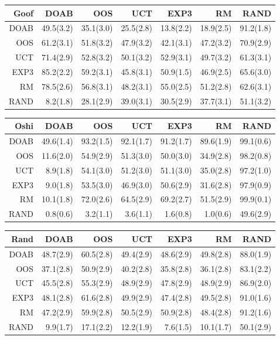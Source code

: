 \begin{figure}
\begin{footnotesize}
\begin{tabular}{|r|rrrrrr|}\hline
Goof&DOAB&OOS&UCT&EXP3&RM&RAND\\\hline
DOAB&49.5(3.2)&35.1(3.0)&25.5(2.8)&13.8(2.2)&18.9(2.5)&91.2(1.8)\\
OOS&61.2(3.1)&51.8(3.2)&47.9(3.2)&42.1(3.1)&47.2(3.2)&70.9(2.9)\\
UCT&71.4(2.9)&52.8(3.2)&50.1(3.2)&52.9(3.1)&49.7(3.2)&61.3(3.1)\\
EXP3&85.2(2.2)&59.2(3.1)&45.8(3.1)&50.9(1.5)&46.9(2.5)&65.6(3.0)\\
RM&78.5(2.6)&56.8(3.1)&48.2(3.1)&55.0(2.5)&51.2(2.8)&62.6(3.1)\\
RAND&8.2(1.8)&28.1(2.9)&39.0(3.1)&30.5(2.9)&37.7(3.1)&51.1(3.2)\\
\hline
\end{tabular}


\begin{tabular}{|r|rrrrrr|}\hline
Oshi&DOAB&OOS&UCT&EXP3&RM&RAND\\\hline
DOAB&49.6(1.4)&93.2(1.5)&92.1(1.7)&91.2(1.7)&89.6(1.9)&99.1(0.6)\\
OOS&11.6(2.0)&54.9(2.9)&51.3(3.0)&50.0(3.0)&34.9(2.8)&98.2(0.8)\\
UCT&8.9(1.8)&54.1(3.0)&51.2(3.0)&51.1(3.0)&35.0(2.8)&97.2(1.0)\\
EXP3&9.0(1.8)&53.5(3.0)&46.9(3.0)&50.6(2.9)&31.6(2.8)&97.9(0.9)\\
RM&10.1(1.8)&72.0(2.6)&64.5(2.9)&69.2(2.7)&51.5(2.9)&99.9(0.1)\\
RAND&0.8(0.6)&3.2(1.1)&3.6(1.1)&1.6(0.8)&1.0(0.6)&49.6(2.9)\\
\hline
\end{tabular}


\begin{tabular}{|r|rrrrrr|}\hline
Rand&DOAB&OOS&UCT&EXP3&RM&RAND\\\hline
DOAB&48.7(2.9)&60.5(2.8)&49.4(2.9)&48.6(2.9)&49.8(2.8)&88.0(1.9)\\
OOS&37.1(2.8)&50.9(2.9)&40.2(2.8)&35.8(2.8)&36.1(2.8)&83.1(2.2)\\
UCT&45.5(2.8)&55.3(2.9)&48.9(2.9)&47.8(2.9)&48.9(2.9)&86.9(2.0)\\
EXP3&48.1(2.8)&61.6(2.8)&49.9(2.9)&47.4(2.8)&49.5(2.8)&91.0(1.6)\\
RM&47.2(2.9)&59.9(2.8)&50.5(2.9)&50.9(2.8)&48.4(2.8)&91.2(1.6)\\
RAND&9.9(1.7)&17.1(2.2)&12.2(1.9)&7.6(1.5)&10.1(1.7)&50.1(2.9)\\
\hline
\end{tabular}


\end{footnotesize}
\end{figure}
